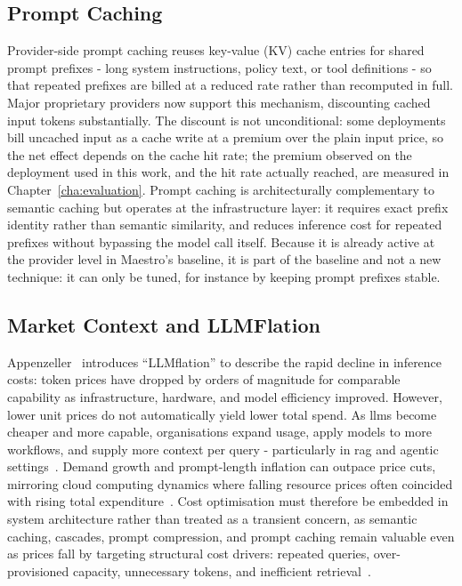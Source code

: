 \subsection{Prompt Caching}
\label{subsec:prompt-caching}

Provider-side prompt caching reuses key-value (KV) cache entries for shared prompt prefixes - long system instructions, policy text, or tool definitions - so that repeated prefixes are billed at a reduced rate rather than recomputed in full. Major proprietary providers now support this mechanism, discounting cached input tokens substantially. The discount is not unconditional: some deployments bill uncached input as a cache write at a premium over the plain input price, so the net effect depends on the cache hit rate; the premium observed on the deployment used in this work, and the hit rate actually reached, are measured in Chapter~\ref{cha:evaluation}. Prompt caching is architecturally complementary to semantic caching but operates at the infrastructure layer: it requires exact prefix identity rather than semantic similarity, and reduces inference cost for repeated prefixes without bypassing the model call itself. Because it is already active at the provider level in Maestro's baseline, it is part of the baseline and not a new technique: it can only be tuned, for instance by keeping prompt prefixes stable.

\subsection{Market Context and LLMFlation}
\label{subsec:market-context}

Appenzeller~\cite{a16z2024llmflation} introduces ``LLMflation'' to describe the rapid decline in inference costs: token prices have dropped by orders of magnitude for comparable capability as infrastructure, hardware, and model efficiency improved. However, lower unit prices do not automatically yield lower total spend. As \glspl{llm} become cheaper and more capable, organisations expand usage, apply models to more workflows, and supply more context per query - particularly in \gls{rag} and agentic settings~\cite{gao2023ragsurvey,closer2025maestro}. Demand growth and prompt-length inflation can outpace price cuts, mirroring cloud computing dynamics where falling resource prices often coincided with rising total expenditure~\cite{armbrust2010view}. Cost optimisation must therefore be embedded in system architecture rather than treated as a transient concern, as semantic caching, cascades, prompt compression, and prompt caching remain valuable even as prices fall by targeting structural cost drivers: repeated queries, over-provisioned capacity, unnecessary tokens, and inefficient retrieval~\cite{bang2023gptcache,chen2023frugalgpt,gao2023ragsurvey,a16z2024llmflation}.


